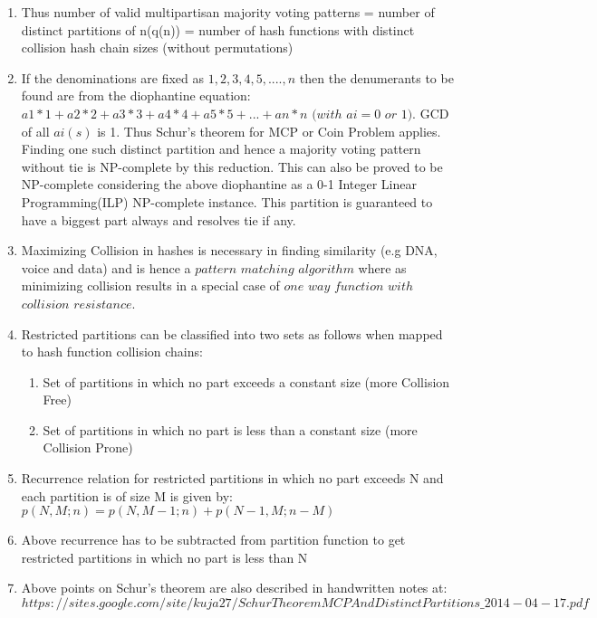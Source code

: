 \documentclass[11pt,onecolumn]{article}
\begin{document}
\begin{enumerate}
\item Thus number of valid multipartisan majority voting patterns = number of distinct partitions of n(q(n)) = number of hash functions with distinct collision hash chain sizes (without permutations)

\item If the denominations are fixed as $1,2,3,4,5,....,n$ then the denumerants to be found are from the diophantine equation: $a1*1 + a2*2 + a3*3 + a4*4 + a5*5 + ...+ an*n$
$(with$ $ai = 0$ $or$ $1)$. GCD of all $ai(s)$ is 1. Thus Schur's theorem for MCP or Coin Problem applies. Finding one such distinct partition and hence a majority voting pattern without tie is NP-complete by this reduction. This can also be proved to be NP-complete considering the above diophantine as a 0-1 Integer Linear Programming(ILP) NP-complete instance. This partition is guaranteed to have a biggest part always and resolves tie if any. 

\item Maximizing Collision in hashes is necessary in finding similarity (e.g DNA, voice and data) and is hence a $pattern$ $matching$ $algorithm$ where as minimizing collision results in a special case of $one$ $way$ $function$ $with$ $collision$ $resistance$.

\item Restricted partitions can be classified into two sets as follows when mapped to hash function collision chains:
\begin{enumerate}
\item Set of partitions in which no part exceeds a constant size (more Collision Free)
\item Set of partitions in which no part is less than a constant size (more Collision Prone)
\end{enumerate}

\item Recurrence relation for restricted partitions in which no part exceeds N and each partition is of size M is given by:
$p(N,M;n) = p(N,M-1;n) + p(N-1,M;n-M)$

\item Above recurrence has to be subtracted from partition function to get restricted partitions in which no part is less than N

\item Above points on Schur's theorem are also described in handwritten notes at: \\
$https://sites.google.com/site/kuja27/SchurTheoremMCPAndDistinctPartitions\_2014-04-17.pdf$

\end{enumerate}
\end{document}
